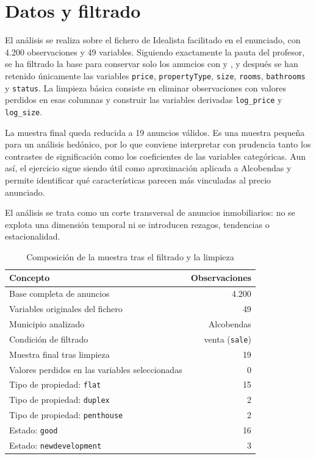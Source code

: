 \documentclass[11pt,a4paper]{article}
\begin{document}
\section{Datos y filtrado}

El análisis se realiza sobre el fichero de Idealista facilitado en el enunciado, con 4.200 observaciones y 49 variables. Siguiendo exactamente la pauta del profesor, se ha filtrado la base para conservar solo los anuncios con \texttt{} y \texttt{}, y después se han retenido únicamente las variables \texttt{price}, \texttt{propertyType}, \texttt{size}, \texttt{rooms}, \texttt{bathrooms} y \texttt{status}. La limpieza básica consiste en eliminar observaciones con valores perdidos en esas columnas y construir las variables derivadas \texttt{log\_price} y \texttt{log\_size}.

La muestra final queda reducida a 19 anuncios válidos. Es una muestra pequeña para un análisis hedónico, por lo que conviene interpretar con prudencia tanto los contrastes de significación como los coeficientes de las variables categóricas. Aun así, el ejercicio sigue siendo útil como aproximación aplicada a Alcobendas y permite identificar qué características parecen más vinculadas al precio anunciado.

El análisis se trata como un corte transversal de anuncios inmobiliarios: no se explota una dimensión temporal ni se introducen rezagos, tendencias o estacionalidad.

\begin{table}[H]
\centering
\caption{Composición de la muestra tras el filtrado y la limpieza}
\label{tab:muestra}
\small
{}
\begin{tabular}{p{8.2cm}r}
\toprule
\rowcolor{tablehead}
Concepto & Observaciones \\
\midrule
Base completa de anuncios & 4.200 \\
Variables originales del fichero & 49 \\
Municipio analizado & Alcobendas \\
Condición de filtrado & venta (\texttt{sale}) \\
Muestra final tras limpieza & 19 \\
Valores perdidos en las variables seleccionadas & 0 \\
\addlinespace
Tipo de propiedad: \texttt{flat} & 15 \\
Tipo de propiedad: \texttt{duplex} & 2 \\
Tipo de propiedad: \texttt{penthouse} & 2 \\
\addlinespace
Estado: \texttt{good} & 16 \\
Estado: \texttt{newdevelopment} & 3 \\
\bottomrule
\end{tabular}
\end{table}
\end{document}
